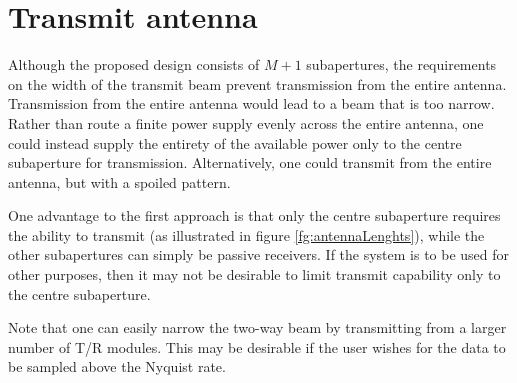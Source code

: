 \section{Transmit antenna}
Although the proposed design consists of $M+1$ subapertures, the requirements on the width of the transmit beam prevent transmission from the entire antenna. Transmission from the entire antenna would lead to a beam that is too narrow. Rather than route a finite power supply evenly across the entire antenna, one could instead supply the entirety of the available power only to the centre subaperture for transmission. Alternatively, one could transmit from the entire antenna, but with a spoiled pattern.
\par
One advantage to the first approach is that only the centre subaperture requires the ability to transmit (as illustrated in figure \ref{fg:antennaLenghts}), while the other subapertures can simply be passive receivers. If the system is to be used for other purposes, then it may not be desirable to limit transmit capability only to the centre subaperture.
\par
Note that one can easily narrow the two-way beam by transmitting from a larger number of T/R modules. This may be desirable if the user wishes for the data to be sampled above the Nyquist rate.
